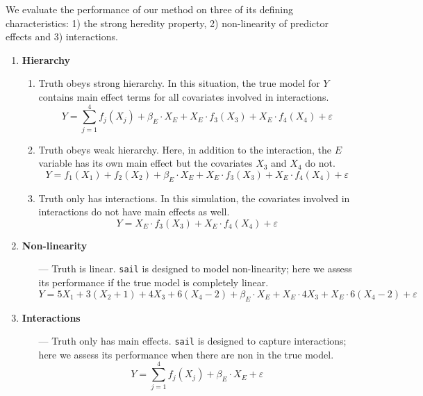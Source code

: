 \documentclass[12pt,letter]{article}\usepackage[]{graphicx}\usepackage[]{color}
\begin{document}
We evaluate the performance of our method on three of its defining characteristics: 1) the strong heredity property, 2) non-linearity of predictor effects and 3) interactions.


\begin{enumerate}
	\item \textbf{Hierarchy}
	\begin{enumerate}
		\item Truth obeys strong hierarchy. In this situation, the true model for $Y$ contains main effect terms for all covariates involved in interactions. \[Y = \sum_{j=1}^{4} f_j(X_{j}) + \beta_E \cdot X_{E} +  X_{E} \cdot f_3(X_{3}) + X_{E} \cdot f_4(X_{4}) + \varepsilon\]
		\item Truth obeys weak hierarchy. Here, in addition to the interaction, the $E$ variable has its own main effect but the covariates $X_3$ and $X_4$ do not.
		\[Y = f_1(X_{1}) + f_2(X_{2}) + \beta_E \cdot X_{E} +  X_{E} \cdot f_3(X_{3}) + X_{E} \cdot f_4(X_{4}) + \varepsilon\]
		\item Truth only has interactions. In this simulation, the covariates involved in interactions do not have main effects as well.  \[Y =  X_{E} \cdot f_3(X_{3}) + X_{E} \cdot f_4(X_{4}) + \varepsilon\]
	\end{enumerate}
	
	\item \textbf{Non-linearity}
	\begin{enumerate}
		\item[---] Truth is linear. \texttt{sail} is designed to model non-linearity; here we assess its performance if the true model is completely linear. \[Y = 5X_1 + 3(X_2 + 1) + 4X_3 + 6(X_4-2) + \beta_E \cdot X_{E} +  X_{E} \cdot 4X_3 + X_{E} \cdot 6(X_4-2) + \varepsilon\]
	\end{enumerate}
	
	\item \textbf{Interactions}
	\begin{enumerate}
		
		\item[---] Truth only has main effects. \texttt{sail} is designed to capture interactions; here we assess its performance when there are non in the true model. \[Y = \sum_{j=1}^{4} f_j(X_{j}) + \beta_E \cdot X_{E} + \varepsilon\]
	\end{enumerate}
	
	
\end{enumerate}
\end{document}
